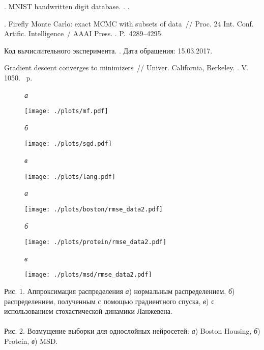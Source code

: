 \documentclass[12pt]{a&t}
\begin{document}
\begin{thebibliography}{10}
. {MNIST} handwritten digit database. 
. .

. Firefly Monte Carlo: exact MCMC with
  subsets of data~// Proc.  24 Int. Conf.
  Artific. Intelligence~/ AAAI Press. 
. 
\newblock P.~4289--4295.

Код вычислительного эксперимента. .
  Дата обращения: 15.03.2017.

 Gradient descent converges
  to minimizers~// {Univer. California, Berkeley}. 
. 
\newblock V. 1050. 
~p.

\end{thebibliography}

\newpage
\begin{figure}[tbh!]



 \caption*{\textit{а}}
  \texttt{[image: ./plots/mf.pdf]}

\endminipage\hfill
{}
\caption*{\textit{б}}
 
  \texttt{[image: ./plots/sgd.pdf]}
 \endminipage\hfill
{}%
 \caption*{\textit{в}}

  \texttt{[image: ./plots/lang.pdf]}
\endminipage\hfill
  \caption{}
\label{fig:var}
\end{figure}

\begin{figure}[tbh!]


\caption*{\textit{а}}
\texttt{[image: ./plots/boston/rmse\_data2.pdf]}
\endminipage\hfill
{}
\caption*{\textit{б}}
\texttt{[image: ./plots/protein/rmse\_data2.pdf]}

\endminipage\hfill
{}%
\caption*{\textit{в}}
\texttt{[image: ./plots/msd/rmse\_data2.pdf]}

\endminipage
\caption{}
\label{fig:noise_in_data}
\end{figure}

\newpage
Рис. 1. Аппроксимация распределения \textit{а}) нормальным распределением, \textit{б}) распределением,
полученным с помощью градиентного спуска, \textit{в}) с использованием стохастической динамики Ланжевена.
\\~\\
Рис. 2. Возмущение выборки для однослойных нейросетей: \textit{а}) Boston Housing, \textit{б}) Protein, \textit{в}) MSD.
\end{document}
